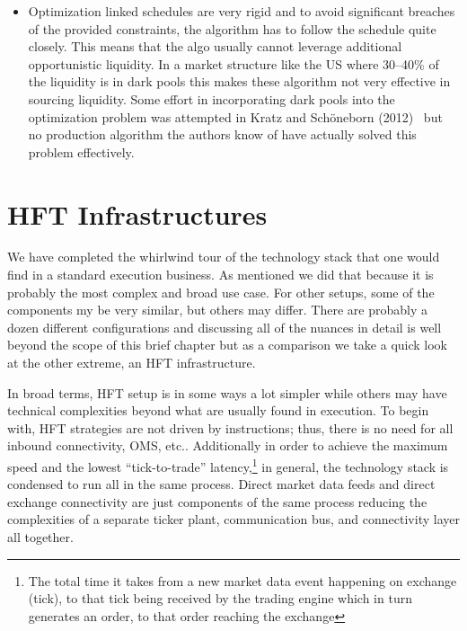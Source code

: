 \begin{itemize}
\item Optimization linked schedules are very rigid and to avoid significant breaches of the provided constraints, the algorithm has to follow the schedule quite closely. This means that the algo usually cannot leverage additional opportunistic liquidity. In a market structure like the US where 30--40\% of the liquidity is in dark pools this makes these algorithm not very effective in sourcing liquidity. Some effort in incorporating dark pools into the optimization problem was attempted in Kratz and Sch\"oneborn (2012)~\cite{kratzschon} but no production algorithm the authors know of have actually solved this problem effectively. 
\end{itemize}



\section{HFT Infrastructures}

We have completed the whirlwind tour of the technology stack that one would find in a standard execution business. As mentioned we did  that because it is probably the most complex and broad use case. For other setups, some of the components my be very similar, but others may differ. There are probably a dozen different configurations and discussing all of the nuances in detail is well beyond the scope of this brief chapter but as a comparison we take a quick look at the other extreme, an HFT infrastructure.


In broad terms, HFT setup is in some ways a lot simpler while others may have technical complexities beyond what are usually found in execution. To begin with, HFT strategies are not driven by instructions; thus, there is no need for all inbound connectivity, OMS, etc..  Additionally in order to achieve the maximum speed and the lowest  ``tick-to-trade'' latency,\footnote{The total time it takes from a new market data event happening on exchange (tick), to that tick being received by the trading engine which in turn generates an order, to that order reaching the exchange} in general, the technology stack is condensed to run all in the same process. Direct market data feeds and direct exchange connectivity are just components of the same process reducing the complexities of a separate ticker plant, communication bus, and connectivity layer all together. 


